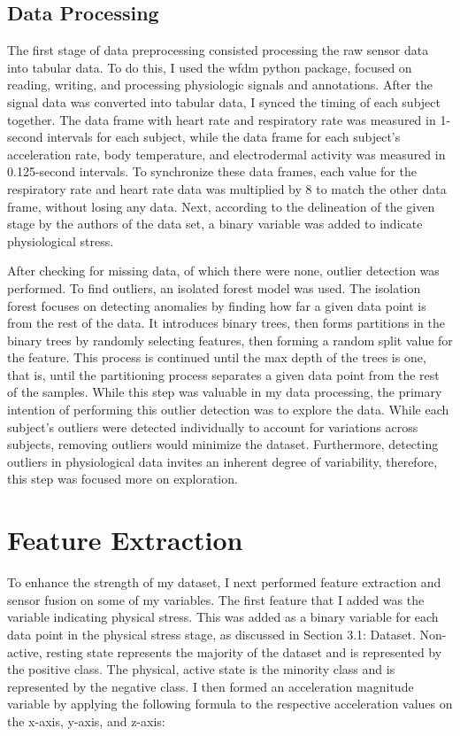 \documentclass{article}
\begin{document}
\subsection{Data Processing}


The first stage of data preprocessing consisted processing the raw sensor data into tabular data. To do this, I used the wfdm python package, focused on reading, writing, and processing physiologic signals and annotations.\cite{wfdb} After the signal data was converted into tabular data, I synced the timing of each subject together. The data frame with heart rate and respiratory rate was measured in 1-second intervals for each subject, while the data frame for each subject's acceleration rate, body temperature, and electrodermal activity was measured in 0.125-second intervals. To synchronize these data frames, each value for the respiratory rate and heart rate data was multiplied by 8 to match the other data frame, without losing any data. Next, according to the delineation of the given stage by the authors of the data set, a binary variable was added to indicate physiological stress. 

After checking for missing data, of which there were none, outlier detection was performed. To find outliers, an isolated forest model was used. The isolation forest focuses on detecting anomalies by finding how far a given data point is from the rest of the data. It introduces binary trees, then forms partitions in the binary trees by randomly selecting features, then forming a random split value for the feature. This process is continued until the max depth of the trees is one, that is, until the partitioning process separates a given data point from the rest of the samples. While this step was valuable in my data processing, the primary intention of performing this outlier detection was to explore the data. While each subject’s outliers were detected individually to account for variations across subjects, removing outliers would minimize the dataset. Furthermore, detecting outliers in physiological data invites an inherent degree of variability, therefore, this step was focused more on exploration. 


\section{Feature Extraction}

To enhance the strength of my dataset, I next performed feature extraction and sensor fusion on some of my variables.
The first feature that I added was the variable indicating physical stress. This was added as a binary variable for each data point in the physical stress stage, as discussed in Section 3.1: Dataset. Non-active, resting state represents the majority of the dataset and is represented by the positive class. The physical, active state is the minority class and is represented by the negative class. I then formed an acceleration magnitude variable by applying the following formula to the respective acceleration values on the x-axis, y-axis, and z-axis: 
\end{document}
